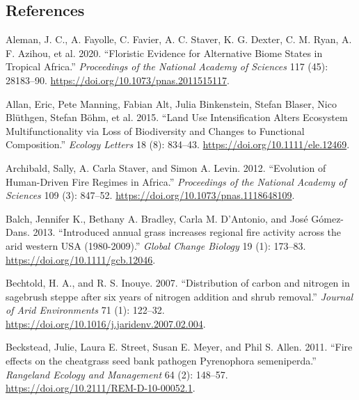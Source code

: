 \documentclass[
  12pt,
]{article}
\newlength{\cslhangindent}
\newlength{\cslentryspacingunit} %
\newenvironment{CSLReferences}[2] %
 {%
  \setlength{\parindent}{0pt}
  \ifodd #1
  \let\oldpar\par
  \def\par{\hangindent=\cslhangindent\oldpar}
  \fi
  \setlength{\parskip}{#2\cslentryspacingunit}
 }%
 {}
\begin{document}
\hypertarget{references}{%
\subsection{References}\label{references}}

\hypertarget{refs}{}
\begin{CSLReferences}{1}{0}
\leavevmode{}%
Aleman, J. C., A. Fayolle, C. Favier, A. C. Staver, K. G. Dexter, C. M.
Ryan, A. F. Azihou, et al. 2020. {``Floristic Evidence for Alternative
Biome States in Tropical {Africa}.''} \emph{Proceedings of the National
Academy of Sciences} 117 (45): 28183--90.
\url{https://doi.org/10.1073/pnas.2011515117}.

\leavevmode{}%
Allan, Eric, Pete Manning, Fabian Alt, Julia Binkenstein, Stefan Blaser,
Nico Blüthgen, Stefan Böhm, et al. 2015. {``Land Use Intensification
Alters Ecosystem Multifunctionality via Loss of Biodiversity and Changes
to Functional Composition.''} \emph{Ecology Letters} 18 (8): 834--43.
\url{https://doi.org/10.1111/ele.12469}.

\leavevmode{}%
Archibald, Sally, A. Carla Staver, and Simon A. Levin. 2012.
{``Evolution of Human-Driven Fire Regimes in {Africa}.''}
\emph{Proceedings of the National Academy of Sciences} 109 (3): 847--52.
\url{https://doi.org/10.1073/pnas.1118648109}.

\leavevmode{}%
Balch, Jennifer K., Bethany A. Bradley, Carla M. D'Antonio, and José
Gómez-Dans. 2013. {``{Introduced annual grass increases regional fire
activity across the arid western USA (1980-2009)}.''} \emph{Global
Change Biology} 19 (1): 173--83.
\url{https://doi.org/10.1111/gcb.12046}.

\leavevmode{}%
Bechtold, H. A., and R. S. Inouye. 2007. {``{Distribution of carbon and
nitrogen in sagebrush steppe after six years of nitrogen addition and
shrub removal}.''} \emph{Journal of Arid Environments} 71 (1): 122--32.
\url{https://doi.org/10.1016/j.jaridenv.2007.02.004}.

\leavevmode{}%
Beckstead, Julie, Laura E. Street, Susan E. Meyer, and Phil S. Allen.
2011. {``{Fire effects on the cheatgrass seed bank pathogen Pyrenophora
semeniperda}.''} \emph{Rangeland Ecology and Management} 64 (2):
148--57. \url{https://doi.org/10.2111/REM-D-10-00052.1}.


\end{CSLReferences}
\end{document}

